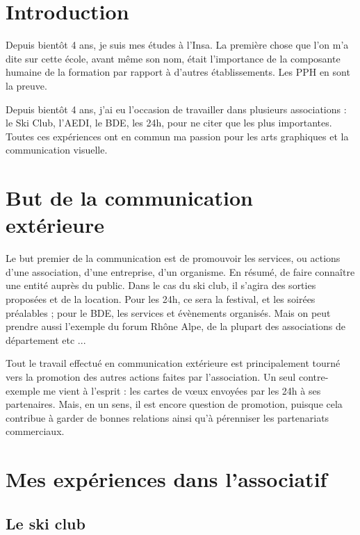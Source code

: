 
\section {Introduction}

    Depuis bientôt 4 ans, je suis mes études à l'Insa.
    La première chose que l'on m'a dite sur cette école, avant même son nom, était  l'importance de la composante humaine de la formation par rapport à d'autres établissements. Les PPH en sont la preuve.

    Depuis bientôt 4 ans, j'ai eu l'occasion de travailler dans plusieurs associations : le Ski Club, l'AEDI, le BDE, les 24h,  pour ne citer que les plus importantes.
    Toutes ces expériences ont en commun ma passion pour les arts graphiques et la communication visuelle.

        
    
\section{But de la communication extérieure}

    Le but premier de la communication est de promouvoir les services, ou actions d'une association, d'une entreprise, d'un organisme.
    En résumé, de faire connaître une entité auprès du public.
    Dans le cas du ski club, il s'agira des sorties proposées et de la location. Pour les 24h, ce sera la festival, et les soirées préalables ; pour le BDE, les services et évènements organisés.
    Mais on peut prendre aussi l'exemple du forum Rhône Alpe, de la plupart des associations de département etc ...

    Tout le travail effectué en communication extérieure est principalement tourné vers la promotion des autres actions faites par l'association.
    Un seul contre-exemple me vient à l'esprit : les cartes de vœux envoyées par les 24h à ses partenaires.  Mais, en un sens, il est encore question de promotion, puisque cela contribue à garder de bonnes relations ainsi qu'à pérenniser les partenariats commerciaux.


\section{Mes expériences dans l'associatif}

    \subsection{Le ski club}
        
